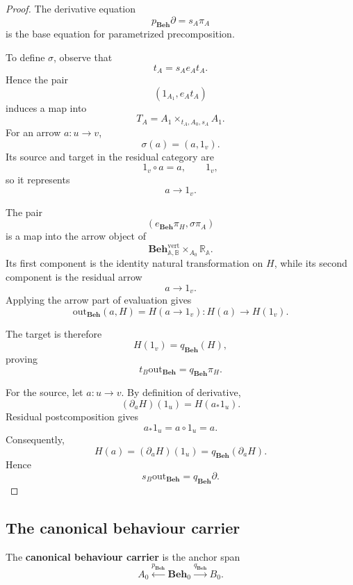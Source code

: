 \begin{proof}
    The derivative equation
    \[
        p_{\mathbf{Beh}}\partial
        =
        s_A\pi_A
    \]
    is the base equation for parametrized precomposition.

    To define \(\sigma\), observe that
    \[
        t_A
        =
        s_Ae_At_A.
    \]
    Hence the pair
    \[
        \left(
            1_{A_1},
            e_At_A
        \right)
    \]
    induces a map into
    \[
        T_A
        =
        A_1\times_{t_A,A_0,s_A}A_1.
    \]
    For an arrow \(a:u\to v\),
    \[
        \sigma(a)=(a,1_v).
    \]
    Its source and target in the residual category are
    \[
        1_v\circ a=a,
        \qquad
        1_v,
    \]
    so it represents
    \[
        a\to1_v.
    \]

    The pair
    \[
        \left(
            e_{\mathbf{Beh}}\pi_H,
            \sigma\pi_A
        \right)
    \]
    is a map into the arrow object of
    \[
        \mathbf{Beh}^{\mathrm{vert}}_{\mathbb A,\mathbb B}
        \times_{A_0}
        \mathbb R_{\mathbb A}.
    \]
    Its first component is the identity natural transformation on \(H\),
    while its second component is the residual arrow
    \[
        a\to1_v.
    \]
    Applying the arrow part of evaluation gives
    \[
        \mathrm{out}_{\mathbf{Beh}}(a,H)
        =
        H(a\to1_v):
        H(a)\to H(1_v).
    \]

    The target is therefore
    \[
        H(1_v)
        =
        q_{\mathbf{Beh}}(H),
    \]
    proving
    \[
        t_B\mathrm{out}_{\mathbf{Beh}}
        =
        q_{\mathbf{Beh}}\pi_H.
    \]

    For the source, let \(a:u\to v\). By definition of derivative,
    \[
        (\partial_aH)(1_u)
        =
        H(a_*1_u).
    \]
    Residual postcomposition gives
    \[
        a_*1_u
        =
        a\circ1_u
        =
        a.
    \]
    Consequently,
    \[
        H(a)
        =
        (\partial_aH)(1_u)
        =
        q_{\mathbf{Beh}}(\partial_aH).
    \]
    Hence
    \[
        s_B\mathrm{out}_{\mathbf{Beh}}
        =
        q_{\mathbf{Beh}}\partial.
    \]
\end{proof}

\subsection{The canonical behaviour carrier}
\label{subsec:canonical-behaviour-carrier}

\begin{definition}
\label{def:canonical-behaviour-carrier}
    The \textbf{canonical behaviour carrier} is the anchor span
    \[
        A_0
        \xleftarrow{p_{\mathbf{Beh}}}
        \mathbf{Beh}_0
        \xrightarrow{q_{\mathbf{Beh}}}
        B_0.
    \]
\end{definition}

